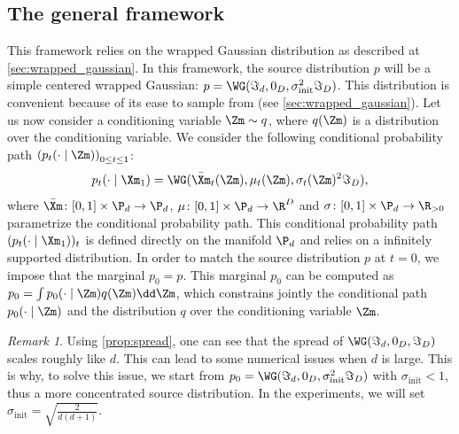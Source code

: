 \documentclass[10pt]{article} %
\theoremstyle{plain}
\theoremstyle{definition}
\theoremstyle{remark}
\newtheorem{remark}[theorem]{Remark}
\begin{document}
\subsection{The general framework}
This framework relies on the wrapped Gaussian distribution as described at \cref{sec:wrapped_gaussian}. In this framework, the source distribution $p$ will be a simple centered wrapped Gaussian: $p = \WG(\Im_d,0_D, \sigma_{\text{init}}^2\Im_D)$. This distribution is convenient because of its ease to sample from (see \cref{sec:wrapped_gaussian}). Let us now consider a conditioning variable $\Zm \sim q$, where $q(\Zm)$ is a distribution over the conditioning variable. We consider the following conditional probability path $\left(p_t(\cdot \mid \Zm)\right)_{0 \leq t \leq 1}$:
\begin{equation}
  p_t(\cdot \mid \Xm_1) = \WG(\bar{\Xm}_t(\Zm), \mu_t(\Zm), \sigma_t(\Zm)^2 \Im_D),
  \label{eq:general_conditional_proba_path}
\end{equation}
where $\bar{\Xm} \colon [0,1] \times \P_d \rightarrow \P_d$, $\mu \colon [0,1] \times \P_d \rightarrow \R^D$ and $\sigma \colon [0,1] \times \P_d \rightarrow \R_{>0}$ parametrize the conditional probability path. This conditional probability path $(p_t(\cdot \mid \Xm_1))_t$ is defined directly on the manifold $\P_d$ and relies on a infinitely supported distribution. In order to match the source distribution $p$ at $t=0$, we impose that the marginal $p_0 = p$. This marginal $p_0$ can be computed as $p_0 =  \int p_0(\cdot \mid \Zm) q(\Zm)\dd\Zm$, which constrains jointly the conditional path $p_0(\cdot \mid \Zm)$ and the distribution $q$ over the conditioning variable $\Zm$.
\begin{remark}
  Using \cref{prop:spread}, one can see that the spread of $\WG(\Im_d,0_D,\Im_D)$ scales roughly like $d$. This can lead to some numerical issues when $d$ is large. This is why, to solve this issue, we start from $p_0 = \WG(\Im_d, 0_D, \sigma_{\text{init}}^2\Im_D)$ with $\sigma_{\text{init}} <1$, thus a more concentrated source distribution.  In the experiments, we will set $\sigma_{\text{init}} = \sqrt{\frac{2}{d(d+1)}}$.
\end{remark}
\end{document}
